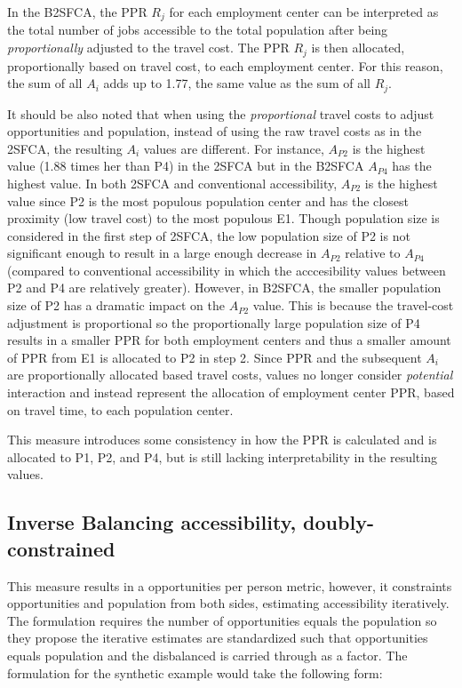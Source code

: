 \documentclass[]{elsarticle} %
\begin{document}
In the B2SFCA, the PPR \(R_{j}\) for each employment center can be
interpreted as the total number of jobs accessible to the total
population after being \emph{proportionally} adjusted to the travel
cost. The PPR \(R_{j}\) is then allocated, proportionally based on
travel cost, to each employment center. For this reason, the sum of all
\(A_{i}\) adds up to 1.77, the same value as the sum of all \(R_{j}\).

It should be also noted that when using the \emph{proportional} travel
costs to adjust opportunities and population, instead of using the raw
travel costs as in the 2SFCA, the resulting \(A_{i}\) values are
different. For instance, \(A_{P2}\) is the highest value (1.88 times her
than P4) in the 2SFCA but in the B2SFCA \(A_{P4}\) has the highest
value. In both 2SFCA and conventional accessibility, \(A_{P2}\) is the
highest value since P2 is the most populous population center and has
the closest proximity (low travel cost) to the most populous E1. Though
population size is considered in the first step of 2SFCA, the low
population size of P2 is not significant enough to result in a large
enough decrease in \(A_{P2}\) relative to \(A_{P4}\) (compared to
conventional accessibility in which the acccesibility values between P2
and P4 are relatively greater). However, in B2SFCA, the smaller
population size of P2 has a dramatic impact on the \(A_{P2}\) value.
This is because the travel-cost adjustment is proportional so the
proportionally large population size of P4 results in a smaller PPR for
both employment centers and thus a smaller amount of PPR from E1 is
allocated to P2 in step 2. Since PPR and the subsequent \(A_{i}\) are
proportionally allocated based travel costs, values no longer consider
\emph{potential} interaction and instead represent the allocation of
employment center PPR, based on travel time, to each population center.

This measure introduces some consistency in how the PPR is calculated
and is allocated to P1, P2, and P4, but is still lacking
interpretability in the resulting values.

\hypertarget{inverse-balancing-accessibility-doubly-constrained}{%
\subsection{Inverse Balancing accessibility,
doubly-constrained}\label{inverse-balancing-accessibility-doubly-constrained}}

This measure results in a opportunities per person metric, however, it
constraints opportunities and population from both sides, estimating
accessibility iteratively. The formulation requires the number of
opportunities equals the population so they propose the iterative
estimates are standardized such that opportunities equals population and
the disbalanced is carried through as a factor. The formulation for the
synthetic example would take the following form:
\end{document}
